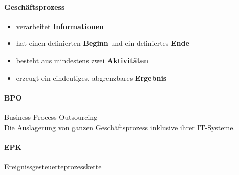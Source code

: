 \documentclass[twocolumn]{article}
\begin{document}
\paragraph{Geschäftsprozess}
	\begin{itemize}
		\item verarbeitet \textbf{Informationen} 
		\item hat einen definierten \textbf{Beginn}  und ein definiertes \textbf {Ende}
		\item besteht aus mindestens zwei \textbf{Aktivitäten}
		\item erzeugt ein eindeutiges, abgrenzbares \textbf{Ergebnis}
	\end{itemize}

\paragraph{BPO}
	Business Process Outsourcing \\
	Die Auslagerung von ganzen Geschäftsprozess inklusive ihrer IT-Systeme.

\paragraph{EPK} Ereignissgesteuerteprozesskette \\
\end{document}
